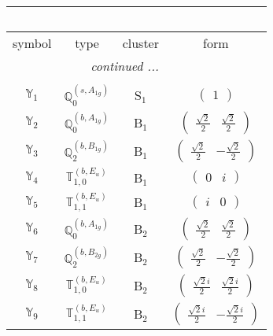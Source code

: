 \documentclass[fleqn,10pt,landscape]{article}
\begin{document}
\begin{itemize}
\begin{center}
\begin{longtable}{c|c|c|c}
\multicolumn{3}{l}{\tablename\ \thetable{}} \\
 \hline \hline
symbol & type & cluster & form \\ \hline \endhead

 \hline \hline
\multicolumn{3}{r}{\footnotesize\it continued ...} \\ \endfoot

 \hline \hline
\multicolumn{3}{r}{} \\ \endlastfoot

$ \mathbb{Y}_{1} $ & $\mathbb{Q}_{0}^{(s,A_{1g})}$ & S$_{1}$ & $\begin{pmatrix} 1 \end{pmatrix}$ \\ \hline
$ \mathbb{Y}_{2} $ & $\mathbb{Q}_{0}^{(b,A_{1g})}$ & B$_{1}$ & $\begin{pmatrix} \frac{\sqrt{2}}{2} & \frac{\sqrt{2}}{2} \end{pmatrix}$ \\
$ \mathbb{Y}_{3} $ & $\mathbb{Q}_{2}^{(b,B_{1g})}$ & B$_{1}$ & $\begin{pmatrix} \frac{\sqrt{2}}{2} & - \frac{\sqrt{2}}{2} \end{pmatrix}$ \\
$ \mathbb{Y}_{4} $ & $\mathbb{T}_{1,0}^{(b,E_{u})}$ & B$_{1}$ & $\begin{pmatrix} 0 & i \end{pmatrix}$ \\
$ \mathbb{Y}_{5} $ & $\mathbb{T}_{1,1}^{(b,E_{u})}$ & B$_{1}$ & $\begin{pmatrix} i & 0 \end{pmatrix}$ \\ \hline
$ \mathbb{Y}_{6} $ & $\mathbb{Q}_{0}^{(b,A_{1g})}$ & B$_{2}$ & $\begin{pmatrix} \frac{\sqrt{2}}{2} & \frac{\sqrt{2}}{2} \end{pmatrix}$ \\
$ \mathbb{Y}_{7} $ & $\mathbb{Q}_{2}^{(b,B_{2g})}$ & B$_{2}$ & $\begin{pmatrix} \frac{\sqrt{2}}{2} & - \frac{\sqrt{2}}{2} \end{pmatrix}$ \\
$ \mathbb{Y}_{8} $ & $\mathbb{T}_{1,0}^{(b,E_{u})}$ & B$_{2}$ & $\begin{pmatrix} \frac{\sqrt{2} i}{2} & \frac{\sqrt{2} i}{2} \end{pmatrix}$ \\
$ \mathbb{Y}_{9} $ & $\mathbb{T}_{1,1}^{(b,E_{u})}$ & B$_{2}$ & $\begin{pmatrix} \frac{\sqrt{2} i}{2} & - \frac{\sqrt{2} i}{2} \end{pmatrix}$ \\ \hline

\end{longtable}
\end{center}
\end{itemize}
\end{document}
